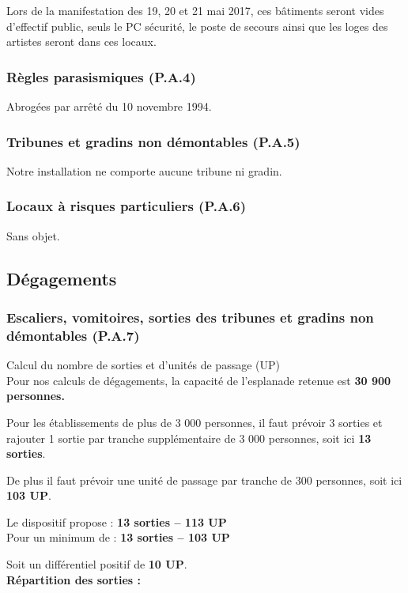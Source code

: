 \documentclass[hidelinks, paper=a4, fontsize=13pt]{report}
\begin{document}
Lors de la manifestation des 19, 20 et 21 mai 2017, ces bâtiments seront vides d’effectif public, seuls le PC sécurité, le poste de secours ainsi que les loges des artistes seront dans ces locaux. 


\subsubsection{Règles parasismiques (P.A.4)} 
Abrogées par arrêté du 10 novembre 1994. 
\subsubsection{Tribunes et gradins non démontables (P.A.5) } 
Notre installation ne comporte aucune tribune ni gradin.
\subsubsection{Locaux à risques particuliers (P.A.6)}
Sans objet. 
\subsection{Dégagements}

\subsubsection{Escaliers, vomitoires, sorties des tribunes et gradins non démontables (P.A.7)}

Calcul du nombre de sorties et d’unités de passage (UP) 
\\
Pour nos calculs de dégagements, la capacité de l’esplanade retenue est \textbf{30 900 personnes.}

Pour les établissements de plus de 3 000 personnes, il faut prévoir 3 sorties et rajouter 1 sortie par tranche supplémentaire de 3 000 personnes, soit ici \textbf{13 sorties}.

De plus il faut prévoir une unité de passage par tranche de 300 personnes, soit ici \textbf{103 UP}. \\

\begin{center}
	Le dispositif propose :        \textbf{13 sorties – 113 UP}\\
	Pour un minimum de :         \textbf{13 sorties – 103 UP}
\end{center}
Soit un différentiel positif de \textbf{10 UP}. \\

\textbf{Répartition des sorties :}
\end{document}
